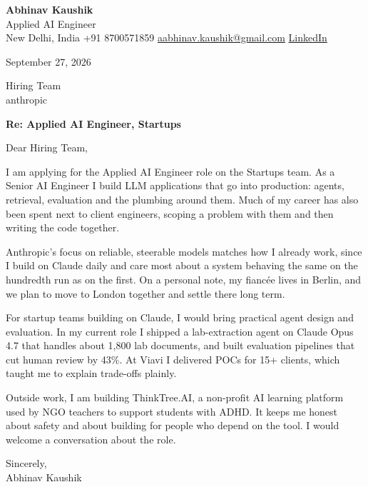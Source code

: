 \documentclass[11pt,a4paper]{article}
\begin{document}
{\Large\bfseries Abhinav Kaushik}\\
Applied AI Engineer\\
New Delhi, India \textbar{} +91 8700571859 \textbar{} \href{mailto:aabhinav.kaushik@gmail.com}{aabhinav.kaushik@gmail.com} \textbar{} \href{https://www.linkedin.com/in/abhinav-kaushik10/}{LinkedIn}  

September 27, 2026

Hiring Team\\
anthropic

\textbf{Re: Applied AI Engineer, Startups}

Dear Hiring Team,

I am applying for the Applied AI Engineer role on the Startups team. As a Senior AI Engineer I build LLM applications that go into production: agents, retrieval, evaluation and the plumbing around them. Much of my career has also been spent next to client engineers, scoping a problem with them and then writing the code together.

Anthropic's focus on reliable, steerable models matches how I already work, since I build on Claude daily and care most about a system behaving the same on the hundredth run as on the first. On a personal note, my fiancée lives in Berlin, and we plan to move to London together and settle there long term.

For startup teams building on Claude, I would bring practical agent design and evaluation. In my current role I shipped a lab-extraction agent on Claude Opus 4.7 that handles about 1,800 lab documents, and built evaluation pipelines that cut human review by 43\%. At Viavi I delivered POCs for 15+ clients, which taught me to explain trade-offs plainly.

Outside work, I am building ThinkTree.AI, a non-profit AI learning platform used by NGO teachers to support students with ADHD. It keeps me honest about safety and about building for people who depend on the tool. I would welcome a conversation about the role.

Sincerely,\\[4pt]
Abhinav Kaushik
\end{document}
